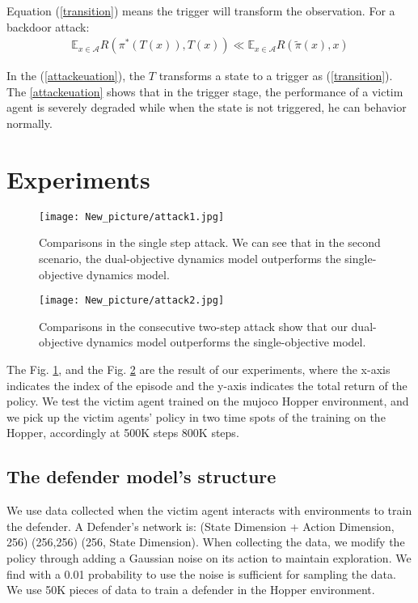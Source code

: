 \documentclass[letterpaper, 10 pt, conference]{ieeeconf}  %
\begin{document}
Equation (\ref{transition}) means the trigger will transform the observation.
 For a backdoor attack:
    \begin{eqnarray}\label{attackeuation}
   \mathbb{E}_{x \in \mathcal{A}} R(\pi^*(T(x)), T(x) )\ll \mathbb{E}_{x \in \mathcal{A}} R(\tilde\pi(x),x)
   \end{eqnarray}

In the (\ref{attackeuation}), the $T$ transforms a state to a trigger as (\ref{transition}). The \ref{attackeuation} shows that in the trigger stage, the performance of a victim agent is severely degraded while when the state is not triggered, he can behavior normally.
\fi



\section{Experiments}

\begin{figure}
    \centering
    \texttt{[image: New\_picture/attack1.jpg]}
    \caption{Comparisons in the single step attack. We can see that in the second scenario, the dual-objective dynamics model outperforms the single-objective dynamics model.}
    \label{attack1}
\end{figure}
\begin{figure}
    \centering
    \texttt{[image: New\_picture/attack2.jpg]}
    \caption{Comparisons in the consecutive two-step attack show that our dual-objective dynamics model outperforms the single-objective model.}
    \label{attack2}
\end{figure}


The Fig. \ref{attack1}, and the Fig. \ref{attack2} are the result of our experiments, where the x-axis indicates the index of the episode and the y-axis indicates the total return of the policy. We test the victim agent trained on the mujoco Hopper environment, and we pick up the victim agents' policy in two time spots of the training on the Hopper, accordingly at 500K steps 800K steps.

\subsection{The defender model's structure}
We use data collected when the victim agent interacts with environments to train the defender. A Defender’s network is: (State Dimension + Action Dimension, 256) (256,256) (256, State Dimension). When collecting the data, we modify the policy through adding a Gaussian noise on its action to maintain exploration. We find with a 0.01 probability to use the noise is sufficient for sampling the data. We use 50K pieces of data to train a defender in the Hopper environment. 
\end{document}

